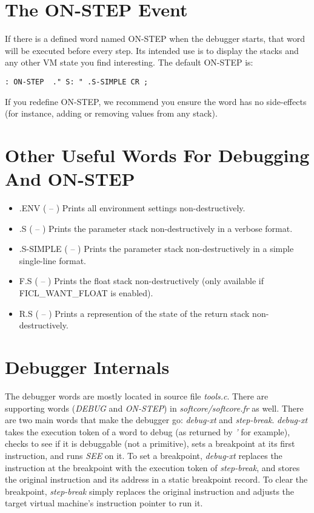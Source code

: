 \section{The ON-STEP Event}
If there is a defined word named ON-STEP when the debugger starts, that
word will be executed before every step. Its intended use is to display
the stacks and any other VM state you find interesting. The default
ON-STEP is:
\begin{lstlisting}[frame=single]
: ON-STEP  ." S: " .S-SIMPLE CR ;
\end{lstlisting}
If you redefine ON-STEP, we recommend you ensure the word has no
side-effects (for instance, adding or removing values from any stack).


\section{Other Useful Words For Debugging And ON-STEP}
\begin{itemize}
	\item .ENV ( -- )\newline
	Prints all environment settings non-destructively.

	\item .S ( -- )\newline
	Prints the parameter stack non-destructively in a verbose
	format.

	\item .S-SIMPLE ( -- )\newline
	Prints the parameter stack non-destructively in a simple
	single-line format.

	\item F.S ( -- )\newline
	Prints the float stack non-destructively (only available if
	FICL\_WANT\_FLOAT is enabled).

	\item R.S ( -- )\newline
	Prints a represention of the state of the return stack
	non-destructively.
\end{itemize}


\section{Debugger Internals}
The debugger words are mostly located in source file \textit{tools.c}.
There are supporting words (\textit{DEBUG} and \textit{ON-STEP}) in
\textit{softcore/softcore.fr} as well. There are two main words that
make the debugger go: \textit{debug-xt} and \textit{step-break}.
\textit{debug-xt} takes the execution token of a word to debug (as
returned by \textit{'} for example), checks to see if it is debuggable
(not a primitive), sets a breakpoint at its first instruction, and runs
\textit{SEE} on it. To set a breakpoint, \textit{debug-xt} replaces the
instruction at the breakpoint with the execution token of
\textit{step-break}, and stores the original instruction and its address
in a static breakpoint record. To clear the breakpoint,
\textit{step-break} simply replaces the original instruction and adjusts
the target virtual machine's instruction pointer to run it.

